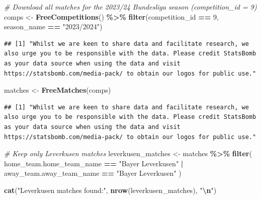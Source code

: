 \documentclass[
]{article}
\newenvironment{Shaded}{\begin{snugshade}}{\end{snugshade}}
\newcommand{\CommentTok}[1]{\textcolor[rgb]{0.56,0.35,0.01}{\textit{#1}}}
\newcommand{\DecValTok}[1]{\textcolor[rgb]{0.00,0.00,0.81}{#1}}
\newcommand{\FunctionTok}[1]{\textcolor[rgb]{0.13,0.29,0.53}{\textbf{#1}}}
\newcommand{\NormalTok}[1]{#1}
\newcommand{\OtherTok}[1]{\textcolor[rgb]{0.56,0.35,0.01}{#1}}
\newcommand{\SpecialCharTok}[1]{\textcolor[rgb]{0.81,0.36,0.00}{\textbf{#1}}}
\newcommand{\StringTok}[1]{\textcolor[rgb]{0.31,0.60,0.02}{#1}}
\begin{document}
\begin{Shaded}
\begin{Highlighting}[]
\CommentTok{\# Download all matches for the 2023/24 Bundesliga season (competition\_id = 9)}
\NormalTok{comps }\OtherTok{\textless{}{-}} \FunctionTok{FreeCompetitions}\NormalTok{() }\SpecialCharTok{\%\textgreater{}\%}
  \FunctionTok{filter}\NormalTok{(competition\_id }\SpecialCharTok{==} \DecValTok{9}\NormalTok{, season\_name }\SpecialCharTok{==} \StringTok{"2023/2024"}\NormalTok{)}
\end{Highlighting}
\end{Shaded}

\begin{verbatim}
## [1] "Whilst we are keen to share data and facilitate research, we also urge you to be responsible with the data. Please credit StatsBomb as your data source when using the data and visit https://statsbomb.com/media-pack/ to obtain our logos for public use."
\end{verbatim}

\begin{Shaded}
\begin{Highlighting}[]
\NormalTok{matches }\OtherTok{\textless{}{-}} \FunctionTok{FreeMatches}\NormalTok{(comps)}
\end{Highlighting}
\end{Shaded}

\begin{verbatim}
## [1] "Whilst we are keen to share data and facilitate research, we also urge you to be responsible with the data. Please credit StatsBomb as your data source when using the data and visit https://statsbomb.com/media-pack/ to obtain our logos for public use."
\end{verbatim}

\begin{Shaded}
\begin{Highlighting}[]
\CommentTok{\# Keep only Leverkusen matches}
\NormalTok{leverkusen\_matches }\OtherTok{\textless{}{-}}\NormalTok{ matches }\SpecialCharTok{\%\textgreater{}\%}
  \FunctionTok{filter}\NormalTok{(}
\NormalTok{    home\_team.home\_team\_name }\SpecialCharTok{==} \StringTok{"Bayer Leverkusen"} \SpecialCharTok{|}
\NormalTok{    away\_team.away\_team\_name }\SpecialCharTok{==} \StringTok{"Bayer Leverkusen"}
\NormalTok{  )}

\FunctionTok{cat}\NormalTok{(}\StringTok{"Leverkusen matches found:"}\NormalTok{, }\FunctionTok{nrow}\NormalTok{(leverkusen\_matches), }\StringTok{"}\SpecialCharTok{\textbackslash{}n}\StringTok{"}\NormalTok{)}
\end{Highlighting}
\end{Shaded}
\end{document}
